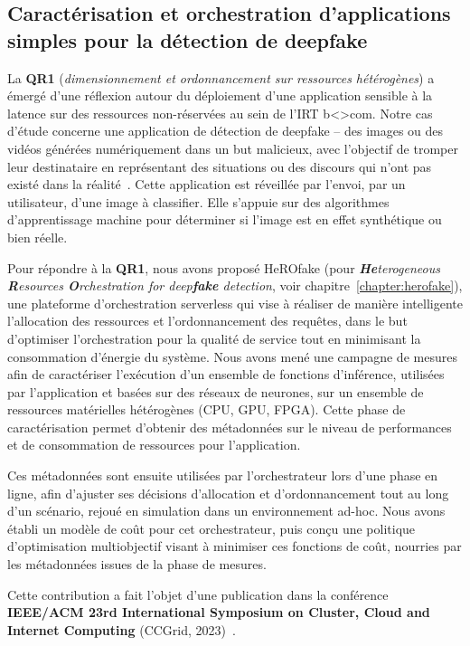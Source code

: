 \subsection{Caractérisation et orchestration d'applications simples pour la détection de deepfake}

La \textbf{QR1} (\textit{dimensionnement et ordonnancement sur ressources hétérogènes}) a émergé d'une réflexion autour du déploiement d'une application sensible à la latence sur des ressources non-réservées au sein de l'IRT b{\textless\textgreater}com. Notre cas d'étude concerne une application de détection de deepfake -- des images ou des vidéos générées numériquement dans un but malicieux, avec l'objectif de tromper leur destinataire en représentant des situations ou des discours qui n'ont pas existé dans la réalité~\cite{westerlundEmergenceDeepfakeTechnology2019}. Cette application est réveillée par l'envoi, par un utilisateur, d'une image à classifier. Elle s'appuie sur des algorithmes d'apprentissage machine pour déterminer si l'image est en effet synthétique ou bien réelle.

\sloppy Pour répondre à la \textbf{QR1}, nous avons proposé HeROfake (pour \textit{\textbf{He}terogeneous \textbf{R}esources \textbf{O}rchestration for deep\textbf{fake} detection}, voir chapitre~\ref{chapter:herofake}), une plateforme d'orchestration serverless qui vise à réaliser de manière intelligente l'allocation des ressources et l'ordonnancement des requêtes, dans le but d'optimiser l'orchestration pour la qualité de service tout en minimisant la consommation d'énergie du système. Nous avons mené une campagne de mesures afin de caractériser l'exécution d'un ensemble de fonctions d'inférence, utilisées par l'application et basées sur des réseaux de neurones, sur un ensemble de ressources matérielles hétérogènes (CPU, GPU, FPGA). Cette phase de caractérisation permet d'obtenir des métadonnées sur le niveau de performances et de consommation de ressources pour l'application.

Ces métadonnées sont ensuite utilisées par l'orchestrateur lors d'une phase en ligne, afin d'ajuster ses décisions d'allocation et d'ordonnancement tout au long d'un scénario, rejoué en simulation dans un environnement ad-hoc. Nous avons établi un modèle de coût pour cet orchestrateur, puis conçu une politique d'optimisation multiobjectif visant à minimiser ces fonctions de coût, nourries par les métadonnées issues de la phase de mesures.

Cette contribution a fait l'objet d'une publication dans la conférence \textbf{IEEE/ACM 23rd International Symposium on Cluster, Cloud and Internet Computing} (CCGrid, 2023)~\cite{herofake}.

